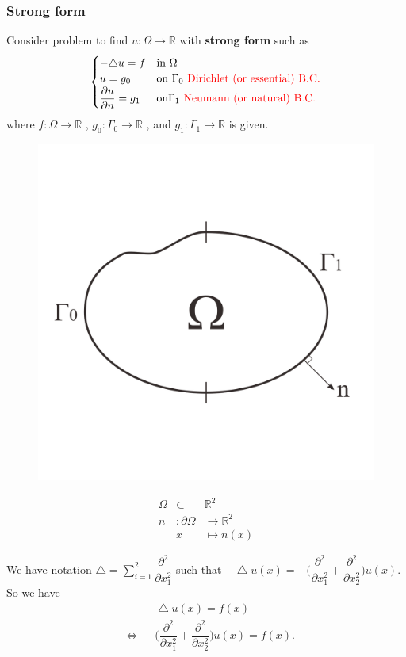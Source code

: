 \documentclass[a4paper,10pt]{article}
\begin{document}
\subsubsection{Strong form}
Consider problem to find $ u : \Omega \rightarrow \mathbb{R} $ with \textbf{strong form} such as 
\begin{equation}\label{strong_form}
\begin{cases}
-\triangle u = f & \text{in } \Omega\\
u = g_{0} & \text{on } \Gamma_{0} \ \text{\textcolor{red}{Dirichlet (or essential) B.C.}} \\
\dfrac{\partial u }{\partial n} = g_{1} & \text{on} \Gamma_{1} \ \text{\textcolor{red}{Neumann (or natural) B.C. }}
\end{cases}
\end{equation}
where $ f : \Omega \rightarrow \mathbb{R} $ , $ g_{0} : \Gamma_{0} \rightarrow \mathbb{R} $ , and $ g_{1} : \Gamma_{1} \rightarrow \mathbb{R} $ is given.

\begin{figure}[h!]
	\centering
	\includegraphics[width=0.5\linewidth]{picture/strongproblem}
	\caption{}
	\label{fig:strongproblem}
\end{figure}

\begin{eqnarray}\nonumber
\Omega &\subset &\mathbb{R}^2 \\ \nonumber
n &: \partial \Omega &\rightarrow \mathbb{R}^2 \\ \nonumber
&x &\mapsto n(x)
\end{eqnarray}

We have notation $ \bigtriangleup = \sum_{i=1}^{2} \dfrac{\partial^2}{\partial x_{1}^{2}} $ such that $ -\bigtriangleup u(x) = -\big( \dfrac{\partial^{2}}{\partial x_{1}^{2}} + \dfrac{\partial^{2}}{\partial x_{2}^{2}} \big)  u(x) $. So we have
\begin{eqnarray}\nonumber
&&-\bigtriangleup u(x) = f(x) \\ \nonumber
&\Leftrightarrow &  - \big( \dfrac{\partial^{2}}{\partial x_{1}^{2}} + \dfrac{\partial^{2}}{\partial x_{2}^{2}} \big) u(x) = f(x).
\end{eqnarray}
\end{document}
